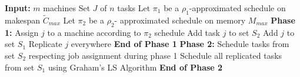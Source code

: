 \documentclass[twocolumn]{svjour3}
\begin{document}
\begin{algorithm}
  \caption{$ABO_\triangle$}
  \label{alg1}
  \begin{algorithmic} 
    \State \textbf{Input:} $m$ machines 
    \State \hspace*{42pt}Set $J$ of $n$ tasks
    \State\hspace*{42pt}Let $\pi_1$ be a $ \rho_1$-approximated schedule on makespan $\tilde{C}_{max}$ 
    \State \hspace*{42pt}Let $\pi_2$ be a $\rho_2$- approximated schedule on memory ${M_{max}}$
    \State
    \State \textbf{Phase 1:}
    \State Assign $j$ to a machine according to $\pi_2$ schedule
    \State Add task $j$ to set $S_2$   
    \EndIf 
    \EndFor
    \State Add $j$ to set $S_1$
    \State Replicate $j$ everywhere   
    \EndIf 
    \EndFor
    \State \textbf{End of Phase 1} 
    \State 
    \State \textbf{Phase 2:} 
    \State \hspace*{42pt}Schedule tasks from set $S_2$ respecting job assignment during phase 1
    \State \hspace*{42pt} Schedule all replicated tasks from set $S_1$ using Graham's LS Algorithm 
    \State \textbf{End of Phase 2} 
    
  \end{algorithmic}
\end{algorithm}
\end{document}
